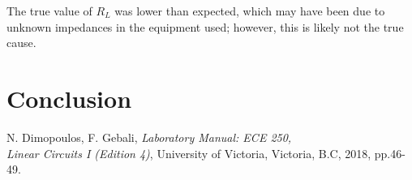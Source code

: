 \documentclass[12pt]{article}
\begin{document}
The true value of \(R_L\) was lower than expected, which may have been due to unknown impedances in the equipment used; however, this is likely not the true cause.




\section{Conclusion}

\newpage
{}
\begin{thebibliography}{1}
    N. Dimopoulos, F. Gebali, \textit{Laboratory Manual: ECE 250, \\ Linear Circuits I (Edition 4)}, University of Victoria, Victoria, B.C, 2018, pp.46-49.
    
\end{thebibliography}
\end{document}

